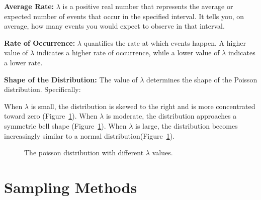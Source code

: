 \documentclass[
  a4paper,
]{scrbook}
\begin{document}
\textbf{Average Rate:} \(\lambda\) is a positive real number that
represents the average or expected number of events that occur in the
specified interval. It tells you, on average, how many events you would
expect to observe in that interval.

\textbf{Rate of Occurrence:} \(\lambda\) quantifies the rate at which
events happen. A higher value of \(\lambda\) indicates a higher rate of
occurrence, while a lower value of \(\lambda\) indicates a lower rate.

\textbf{Shape of the Distribution:} The value of \(\lambda\) determines
the shape of the Poisson distribution. Specifically:

When \(\lambda\) is small, the distribution is skewed to the right and
is more concentrated toward zero (Figure~\ref{fig-pois}). When
\(\lambda\) is moderate, the distribution approaches a symmetric bell
shape (Figure~\ref{fig-pois}). When \(\lambda\) is large, the
distribution becomes increasingly similar to a normal
distribution(Figure~\ref{fig-pois}).

\begin{figure}[ht]


\caption{\label{fig-pois}The poisson distribution with different
\(\lambda\) values.}

\end{figure}%


\chapter{Sampling Methods}\label{sampling-methods}
\end{document}
